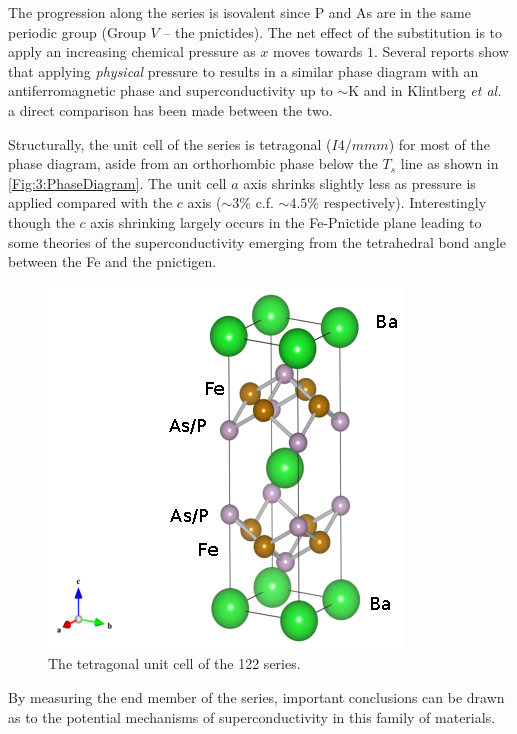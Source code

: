  The progression along the series is isovalent since P and As are in the same periodic group (Group $V$ -- the pnictides). The net effect of the substitution is to apply an increasing chemical pressure as $x$ moves towards $1$. Several reports show that applying \textit{physical} pressure to \BaFeAs results in a similar phase diagram with an antiferromagnetic phase and superconductivity up to $\sim$\unit[30]{K}\cite{Yamazaki2010,Colombier2009,Alireza2009} and in Klintberg \textit{et al.}\cite{Klintberg2010} a direct comparison has been made between the two. 

Structurally, the unit cell of the series is tetragonal ($I4/mmm$) for most of the phase diagram, aside from an orthorhombic phase below the $T_s$ line as shown in \fig\ref{Fig:3:PhaseDiagram}. The unit cell $a$ axis shrinks slightly less as pressure is applied compared with the $c$ axis ($\sim3\%$ c.f. $\sim4.5\%$ respectively). Interestingly though the $c$ axis shrinking largely occurs in the Fe-Pnictide plane leading to some theories of the superconductivity emerging from the tetrahedral bond angle between the Fe and the pnictigen. %

\begin{figure}
    \begin{center}
        \includegraphics[scale=1.0]{Chapter3-dHvABaFe2P2/Figures/BaFe2P2Series/UnitCell/UnitCell}
        \caption{The tetragonal unit cell of the 122 \BaFePAs series.}
        \label{Fig:3:UnitCell}
    \end{center}
\end{figure}

By measuring the end member of the series, important conclusions can be drawn as to the potential mechanisms of superconductivity in this family of materials.

